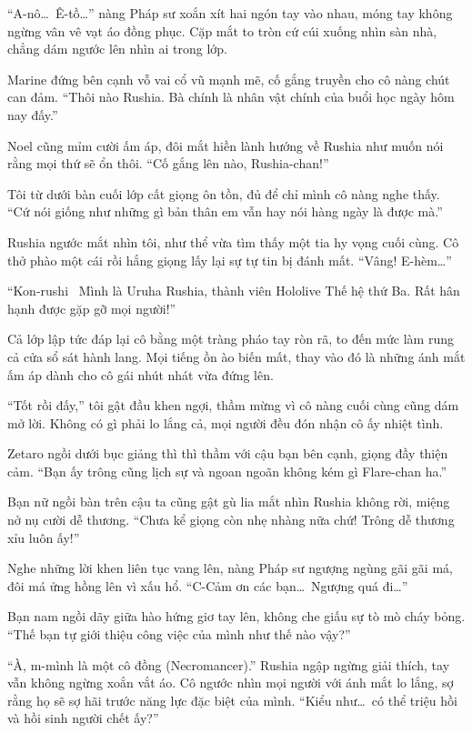 \documentclass[../main.tex]{subfiles}
\begin{document}
``A-nô\dots\ Ê-tồ\dots'' nàng Pháp sư xoắn xít hai ngón tay vào nhau, móng tay không ngừng vân vê vạt áo đồng phục. Cặp mắt to tròn cứ cúi xuống nhìn sàn nhà, chẳng dám ngước lên nhìn ai trong lớp.

Marine đứng bên cạnh vỗ vai cổ vũ mạnh mẽ, cố gắng truyền cho cô nàng chút can đảm. ``Thôi nào Rushia. Bà chính là nhân vật chính của buổi học ngày hôm nay đấy.''

Noel cũng mỉm cười ấm áp, đôi mắt hiền lành hướng về Rushia như muốn nói rằng mọi thứ sẽ ổn thôi. ``Cố gắng lên nào, Rushia-chan!''

Tôi từ dưới bàn cuối lớp cất giọng ôn tồn, đủ để chỉ mình cô nàng nghe thấy. ``Cứ nói giống như những gì bản thân em vẫn hay nói hàng ngày là được mà.''

Rushia ngước mắt nhìn tôi, như thể vừa tìm thấy một tia hy vọng cuối cùng. Cô thở phào một cái rồi hắng giọng lấy lại sự tự tin bị đánh mất. ``Vâng! E-hèm\dots''

``Kon-rushi~ Mình là Uruha Rushia, thành viên Hololive Thế hệ thứ Ba. Rất hân hạnh được gặp gỡ mọi người!''

Cả lớp lập tức đáp lại cô bằng một tràng pháo tay ròn rã, to đến mức làm rung cả cửa sổ sát hành lang. Mọi tiếng ồn ào biến mất, thay vào đó là những ánh mắt ấm áp dành cho cô gái nhút nhát vừa đứng lên.

``Tốt rồi đấy,'' tôi gật đầu khen ngợi, thầm mừng vì cô nàng cuối cùng cũng dám mở lời. Không có gì phải lo lắng cả, mọi người đều đón nhận cô ấy nhiệt tình.

Zetaro ngồi dưới bục giảng thì thì thầm với cậu bạn bên cạnh, giọng đầy thiện cảm. ``Bạn ấy trông cũng lịch sự và ngoan ngoãn không kém gì Flare-chan ha.''

Bạn nữ ngồi bàn trên cậu ta cũng gật gù lia mắt nhìn Rushia không rời, miệng nở nụ cười dễ thương. ``Chưa kể giọng còn nhẹ nhàng nữa chứ! Trông dễ thương xỉu luôn ấy!''

Nghe những lời khen liên tục vang lên, nàng Pháp sư ngượng ngùng gãi gãi má, đôi má ửng hồng lên vì xấu hổ. ``C-Cảm ơn các bạn\dots\ Ngượng quá đi\dots''

Bạn nam ngồi dãy giữa hào hứng giơ tay lên, không che giấu sự tò mò cháy bỏng. ``Thế bạn tự giới thiệu công việc của mình như thế nào vậy?''

``À, m-mình là một cô đồng (Necromancer).'' Rushia ngập ngừng giải thích, tay vẫn không ngừng xoắn vắt áo. Cô ngước nhìn mọi người với ánh mắt lo lắng, sợ rằng họ sẽ sợ hãi trước năng lực đặc biệt của mình. ``Kiểu như\dots\ có thể triệu hồi và hồi sinh người chết ấy?''
\end{document}
